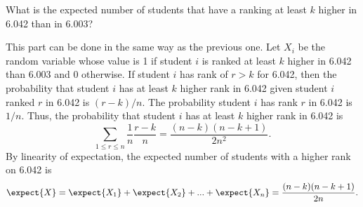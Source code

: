 \begin{problem}
\ppart\label{khigher}
What is the expected number of students that have a ranking at
least $k$ higher in 6.042 than in 6.003?

\examspace[3.0in]

\begin{solution}
This part can be done in the same way as the previous one.  Let $X_i$
be the random variable whose value is 1 if student $i$ is ranked at
least $k$ higher in 6.042 than 6.003 and 0 otherwise.  If student $i$
has rank of $r>k$ for 6.042, then the probability that student $i$ has
at least $k$ higher rank in 6.042 given student $i$ ranked $r$ in
6.042 is $(r-k)/n$.  The probability student $i$ has rank $r$ in 6.042
is $1/n$.  Thus, the probability that student $i$ has at least $k$
higher rank in 6.042 is
\[
\sum_{1\leq r\leq n} \frac{1}{n} \frac{r-k}{n} = \frac{(n-k)(n-k+1)}{2n^2}.
\]
By linearity of expectation, the expected number of students with a higher
rank on 6.042 is
\[
\expect{X}=\expect{X_1}+\expect{X_2}+...+\expect{X_n} = \frac{(n-k)(n-k+1)}{2n}.
\]
\end{solution}

\eparts
\end{problem}
\examspace

